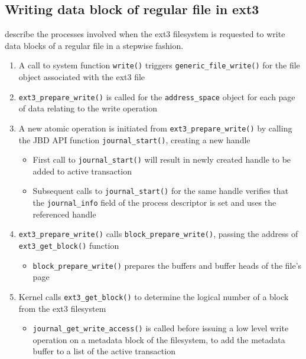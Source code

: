 \subsection{Writing data block of regular file in ext3}

\citet[p. 772-774]{Bovet2006} describe the processes involved when the ext3 filesystem is requested to write data blocks of a regular file in a stepwise fashion.

\begin{enumerate}
	\item A call to system function \texttt{write()} triggers \texttt{generic_file_write()} for the file object associated with the ext3 file
	\item \texttt{ext3_prepare_write()} is called for the \texttt{address_space} object for each page of data relating to the write operation
	\item A new atomic operation is initiated from \texttt{ext3_prepare_write()} by calling the JBD API function \texttt{journal_start()}, creating a new handle
		\begin{itemize}
			\item First call to \texttt{journal_start()} will result in newly created handle to be added to active transaction
			\item Subsequent calls to \texttt{journal_start()} for the same handle verifies that the \texttt{journal_info} field of the process descriptor is set and uses the referenced handle
		\end{itemize}
	\item \texttt{ext3_prepare_write()} calls \texttt{block_prepare_write()}, passing the address of \texttt{ext3_get_block()} function
		\begin{itemize}
		\item \texttt{block_prepare_write()} prepares the buffers and buffer heads of the file's page
		\end{itemize}
	\item Kernel calls \texttt{ext3_get_block()} to determine the logical number of a block from the ext3 filesystem
		\begin{itemize}
		\item \texttt{journal_get_write_access()} is called before issuing a low level write operation on a metadata block of the filesystem, to add the metadata buffer to a list of the active transaction

\end{itemize}
\end{enumerate}
